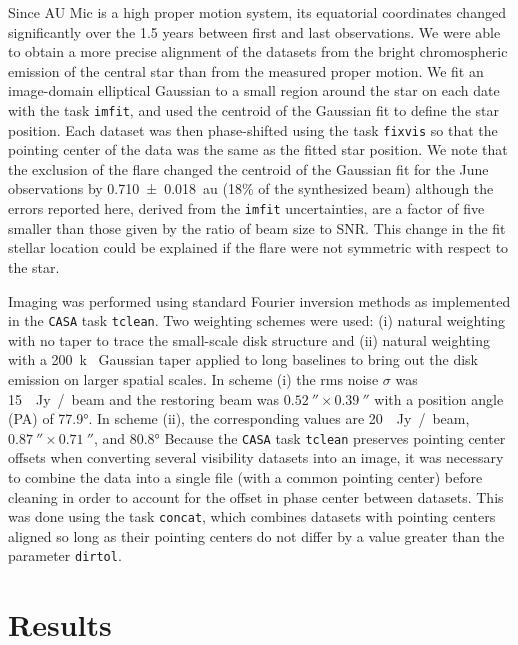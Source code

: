 \documentclass[modern]{aastex62}
\begin{document}
Since AU Mic is a high proper motion system, its equatorial coordinates changed significantly over the 1.5 years between first and last observations.  
We were able to obtain a more precise alignment of the datasets from the bright chromospheric emission of the central star than from the measured proper motion.
We fit an image-domain elliptical Gaussian to a small region around the star on each date with the task \texttt{imfit}, and used the centroid of the Gaussian fit to define the star position.
Each dataset was then phase-shifted using the task \texttt{fixvis} so that the pointing center of the data was the same as the fitted star position.
We note that the exclusion of the flare changed the centroid of the Gaussian fit for the June observations by \SI{0.710 \pm 0.018}{au} (18\% of the synthesized beam) although the errors reported here, derived from the \texttt{imfit} uncertainties, are a factor of five smaller than those given by the ratio of beam size to SNR.
This change in the fit stellar location could be explained if the flare were not symmetric with respect to the star.

Imaging was performed using standard Fourier inversion methods as implemented in the \texttt{CASA} task \texttt{tclean}. 
Two weighting schemes were used: (i) natural weighting with no taper to trace the small-scale disk structure and (ii) natural weighting with a \SI{200}{k\lambda} Gaussian taper applied to long baselines to bring out the disk emission on larger spatial scales. 
In scheme (i) the rms noise $\sigma$ was \SI{15}{\mu Jy / beam} and the restoring beam was $\SI{0.52}{\arcsecond} \times \SI{0.39}{\arcsecond}$ with a position angle (PA) of \ang[angle-symbol-over-decimal]{77.9}. 
In scheme (ii), the corresponding values are \SI{20}{\mu Jy / beam}, $\SI{0.87}{\arcsecond} \times \SI{0.71}{\arcsecond}$, and \ang[angle-symbol-over-decimal]{80.8}
Because the \texttt{CASA} task \texttt{tclean} preserves pointing center offsets when converting several visibility datasets into an image, it was necessary to combine the data into a single file (with a common pointing center) before cleaning in order to account for the offset in phase center between datasets. 
This was done using the task \texttt{concat}, which combines datasets with pointing centers aligned so long as their pointing centers do not differ by a value greater than the parameter \texttt{dirtol}.

\section{Results}
\label{section: results}
\end{document}

